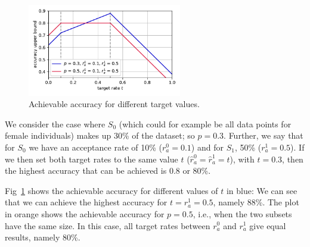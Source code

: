 \begin{figure}[t]
  \centering
  \includegraphics[width=0.6\textwidth]{paper1/figures/plot.pdf}
  \caption{Achievable accuracy for different target values.}%
  \label{fig:accvstarget}
\end{figure}
\begin{example}
  We consider the case where $S_0$
  (which could for example be all data points for female individuals) makes up 30\% of the dataset; so $p = 0.3$.
  Further, we say that for $S_0$ we have an acceptance rate of 10\% ($r^0_a = 0.1$)
  and for $S_1$, 50\% ($r^1_a = 0.5$).
  If we then set both target rates to the same value $t$ ($\hat{r}^0_a=\hat{r}^1_a=t$), with $t = 0.3$,
  then the highest accuracy that can be achieved is $0.8$ or 80\%.

  Fig~\ref{fig:accvstarget} shows the achievable accuracy for different values of $t$ in blue:
  We can see that we can achieve the highest accuracy for $t=r^1_a=0.5$, namely 88\%.
  The plot in orange shows the achievable accuracy for $p=0.5$, i.e., when the two subsets have the same size.
  In this case, all target rates between $r^0_a$ and $r^1_a$ give equal results, namely 80\%.
\end{example}

